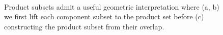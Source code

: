 \documentclass[
  letterpaper,
  DIV=11,
  numbers=noendperiod]{scrartcl}
\begin{document}
\begin{figure}
\begin{minipage}[t]{0.66\linewidth}
{{}

}

\subcaption{\label{fig-product-set2}}
\end{minipage}%
%
\begin{minipage}[t]{0.17\linewidth}

{\centering 

~

}

\end{minipage}%
\newline
\begin{minipage}[t]{0.33\linewidth}

{\centering 

~

}

\end{minipage}%
%
\begin{minipage}[t]{0.34\linewidth}

{\centering 


}

\subcaption{\label{fig-product-set3}}
\end{minipage}%
%
\begin{minipage}[t]{0.33\linewidth}

{\centering 

~

}

\end{minipage}%

\caption{\label{fig-product-set}Product subsets admit a useful geometric
interpretation where (a, b) we first lift each component subset to the
product set before (c) constructing the product subset from their
overlap.}

\end{figure}
\end{document}
